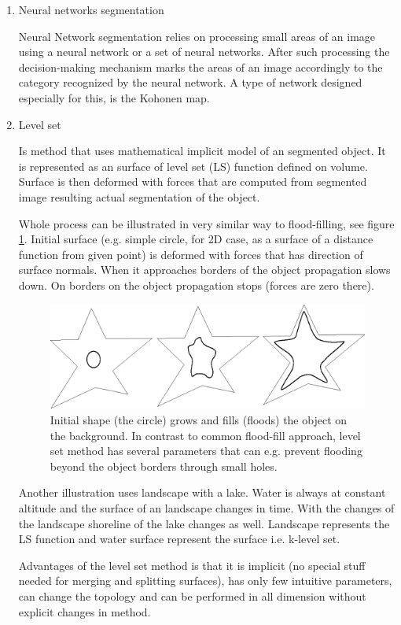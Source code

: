 \begin{enumerate}
  \item  Neural networks segmentation

  Neural Network segmentation relies on processing small areas of an image using a neural network or a set of neural networks.
After such processing the decision-making mechanism marks the areas of an image accordingly to the category recognized by the neural network.
A type of network designed especially for this, is the Kohonen map.

  \item Level set

Is method that uses mathematical implicit model of an segmented object.
It is represented as an surface of level set (LS) function defined on volume.
Surface is then deformed with forces that are computed from segmented image resulting actual segmentation of the object.

Whole process can be illustrated in very similar way to flood-filling, see figure \ref{fg:flooding}.
Initial surface (e.g. simple circle, for 2D case, as a surface of a distance function from given point) is deformed with forces that has direction of surface normals.
When it approaches borders of the object propagation slows down.
On borders on the object propagation stops (forces are zero there).

\begin{figure}
    \centering
    \includegraphics[width=12cm]{data/flooding}
    \caption[Flooding an object]{Initial shape (the circle) grows and fills (floods) the object on the background. In contrast to common flood-fill approach, level set method has several parameters that can e.g. prevent flooding beyond the object borders through small holes.}
    \label{fg:flooding}
\end{figure}

\par
Another illustration uses landscape with a lake.
Water is always at constant altitude and the surface of an landscape changes in time.
With the changes of the landscape shoreline of the lake changes as well.
Landscape represents the LS function and water surface represent the surface i.e. k-level set.

\par
Advantages of the level set method is that it is implicit (no special stuff needed for merging and splitting surfaces), has only few intuitive parameters, can change the topology and can be performed in all dimension without explicit changes in method.

\end{enumerate}

